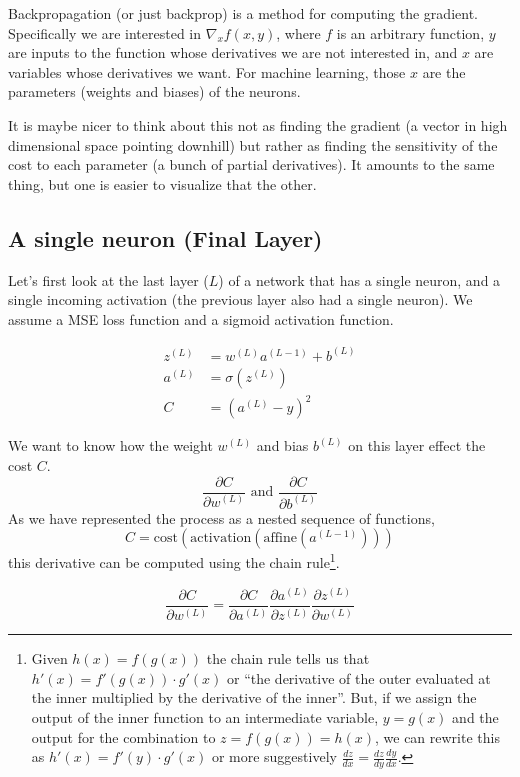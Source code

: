 \documentclass{article}
\begin{document}
Backpropagation (or just backprop) is a method for computing the gradient. Specifically we are interested in $\nabla_{x} f(x, y)$, where $f$ is an arbitrary function, $y$ are inputs to the function whose derivatives we are not interested in, and $x$ are variables whose derivatives we want.
For machine learning, those $x$ are the parameters (weights and biases) of the neurons.

It is maybe nicer to think about this not as finding the gradient (a vector in high dimensional space pointing downhill) but rather as finding the sensitivity of the cost to each parameter (a bunch of partial derivatives).
It amounts to the same thing, but one is easier to visualize that the other.

\subsection{A single neuron (Final Layer)}

Let's first look at the last layer ($L$) of a network that has a single neuron, and a single incoming activation (the previous layer also had a single neuron). We assume a MSE loss function and a sigmoid activation function.

\begin{align}
    z^{(L)} &= w^{(L)} a^{(L - 1)} + b^{(L)} \\
    a^{(L)} &= \sigma(z^{(L)}) \\
    C &= (a^{(L)} - y)^2
\end{align}

\noindent
We want to know how the weight $w^{(L)}$ and bias $b^{(L)}$ on this layer effect the cost $C$.
$$
\frac{\partial C}{\partial w^{(L)}} \text{  and  }
\frac{\partial C}{\partial b^{(L)}}
$$
As we have represented the process as a nested sequence of functions,
$$
C = \text{cost}(\text{activation}(\text{affine}(a^{(L - 1)})))
$$
this derivative can be computed using the chain rule\footnote{
Given $h(x) = f(g(x))$ the chain rule tells us that $h'(x) = f'(g(x)) \cdot g'(x)$ or ``the derivative of the outer evaluated at the inner multiplied by the derivative of the inner''. But, if we assign the output of the inner function to an intermediate variable, $y = g(x)$ and the output for the combination to $z = f(g(x)) = h(x)$, we can rewrite this as $h'(x) = f'(y) \cdot g'(x)$ or more suggestively $ \frac{dz}{dx} = \frac{dz}{dy} \frac{dy}{dx} $.
}.


\begin{equation}
    \frac{\partial C}{\partial w^{(L)}} = \frac{\partial C}{\partial a^{(L)}} \frac{\partial a^{(L)}}{\partial z^{(L)}} \frac{\partial z^{(L)}}{\partial w^{(L)}}
    \label{eq:finalLayerChain}
\end{equation}
\end{document}
